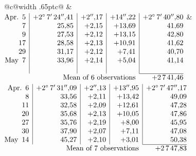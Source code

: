 \noindent\begin{tabular}{@{}c@{\hspace{.4em}\vrule width .65pt\hspace{.4em}}c@{}}
 &
 \\[.18ex]
\(\begin{array}[t]{@{}r|r|r|r|r@{}}
\text{Apr.}\enspace 5 & +2^\circ\,7'\,24''{,}41 & +2''{,}17 & +14''{,}22 & +2^\circ\,7'\,40''{,}80\\
7 & 25{,}85 & +2{,}15 & +13{,}69 & 41{,}69\\
9 & 27{,}53 & +2{,}12 & +13{,}15 & 42{,}80\\
17 & 28{,}58 & +2{,}13 & +10{,}91 & 41{,}62\\
29 & 31{,}17 & +2{,}12 & +7{,}41 & 40{,}70\\
\text{May}\enspace 7 & 33{,}96 & +2{,}14 & +5{,}04 & 41{,}14\\
 & & & & \\
\cline{5-5}
\multicolumn{4}{r}{\text{Mean of 6 observations}} & +2\,7\,41{,}46
\end{array}\)
&
\(\begin{array}[t]{@{}r|r|r|r|r@{}}
\text{Apr.}\enspace 6 & +2^\circ\,7'\,31''{,}09 & +2''{,}13 & +13''{,}95 & +2^\circ\,7'\,47''{,}17\\
8 & 33{,}56 & +2{,}11 & +13{,}42 & 49{,}09\\
11 & 32{,}58 & +2{,}09 & +12{,}61 & 47{,}28\\
20 & 35{,}68 & +2{,}13 & +10{,}05 & 47{,}86\\
27 & 35{,}76 & +2{,}19 & +8{,}00 & 45{,}95\\
30 & 37{,}90 & +2{,}07 & +7{,}11 & 47{,}08\\
\text{May}\enspace 14 & 45{,}27 & +2{,}10 & +3{,}01 & 50{,}38\\
\cline{5-5}
\multicolumn{4}{r}{\text{Mean of 7 observations}} & +2\,7\,47{,}83
\end{array}\)
\end{tabular}\par\medskip
